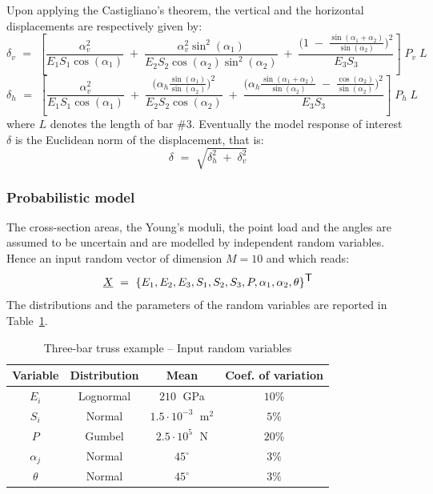 \documentclass[11pt]{article}
\begin{document}
Upon applying the Castigliano's theorem, the vertical and the horizontal displacements are respectively given by:
\begin{equation}
 \delta_v \, \, = \, \,
 \left[ \frac{\alpha_v^2}{E_1 S_1 \cos(\alpha_1)} \; + \; \frac{\alpha_v^2 \sin^2(\alpha_1)}{E_2 S_2 \cos(\alpha_2) \sin^2(\alpha_2)} \; + \;
\frac{\big( 1 \; - \; \frac{\sin(\alpha_1 + \alpha_2)}{\sin(\alpha_2)}\big)^2}{E_3 S_3}  \right] 
\; P_v \; L
\end{equation}
\begin{equation}
 \delta_h  \, \, = \, \,  
\left[ 
 \frac{\alpha_v^2}{E_1 S_1 \cos(\alpha_1)} \; + \;  \frac{\big(\alpha_h \frac{\sin(\alpha_1)}{\sin(\alpha_2)}  \big)^2}{E_2 S_2 \cos(\alpha_2)} \; + \;
\frac{\big(\alpha_h \frac{\sin(\alpha_1 + \alpha_2)}{\sin(\alpha_2)} \; - \; \frac{\cos(\alpha_2)}{\sin(\alpha_2)} \big)^2}{E_3 S_3}
\right] 
\; P_h \; L
\end{equation}
where $L$ denotes the length of bar \#3. Eventually the model response of interest $\delta$ is the Euclidean norm of the displacement, that is:
\begin{equation}
 \delta \, \, = \, \, \sqrt{\delta_h^2 \; + \; \delta_v^2}
\end{equation}

\subsubsection{Probabilistic model}

The cross-section areas, the Young's moduli, the point load and the angles are assumed to be uncertain and are modelled by independent random variables. Hence an input random vector of dimension $M=10$ and which reads:
\begin{equation}
 \underline{X} \, \, = \, \, \{E_1,E_2,E_3,S_1,S_2,S_3,P,\alpha_1,\alpha_2,\theta\}^{\mbox{\textsf{T}}}
\end{equation}
The distributions and the parameters of the random variables are reported in Table~\ref{table_rvs}.


\begin{table}[Hhbtp] 
 \begin{center}
  \begin{tabular}{cccc}
\hline
   Variable & Distribution & Mean & Coef. of variation \\
\hline
$E_i$ &  Lognormal & $210 \;$ GPa& $10\%$ \\
$S_i$ & Normal & $1.5\cdot 10^{-3}\;$ m$^2$ & $5\%$ \\
$P$ & Gumbel & $2.5\cdot10^{5}\;$ N& $20\%$ \\
$\alpha_j$ & Normal & $45^\circ$& $3\%$\\
$\theta$ & Normal & $45^\circ$& $3\%$   \\
\hline
  \end{tabular}
\caption{Three-bar truss example -- Input random variables}
\label{table_rvs}
 \end{center}

\end{table}
\end{document}
